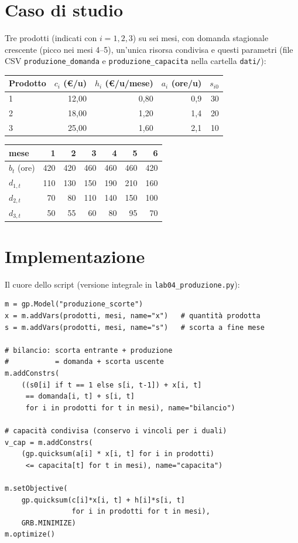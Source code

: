 \section{Caso di studio}

Tre prodotti (indicati con $i = 1, 2, 3$) su sei mesi, con domanda stagionale crescente (picco nei mesi
4--5), un'unica risorsa condivisa e questi parametri (file CSV
\texttt{produzione\_domanda} e \texttt{produzione\_capacita} nella cartella
\texttt{dati/}):

\begin{center}\small
\begin{tabular}{lrrrr}
\toprule
Prodotto & $c_i$ (\euro/u) & $h_i$ (\euro/u/mese) & $a_i$ (ore/u) & $s_{i0}$ \\
\midrule
1 & 12{,}00 & 0{,}80 & 0{,}9 & 30 \\
2 & 18{,}00 & 1{,}20 & 1{,}4 & 20 \\
3 & 25{,}00 & 1{,}60 & 2{,}1 & 10 \\
\bottomrule
\end{tabular}
\qquad
\begin{tabular}{lrrrrrr}
\toprule
mese & 1 & 2 & 3 & 4 & 5 & 6 \\
\midrule
$b_t$ (ore) & 420 & 420 & 460 & 460 & 460 & 420 \\
$d_{1,t}$ & 110 & 130 & 150 & 190 & 210 & 160 \\
$d_{2,t}$ & 70 & 80 & 110 & 140 & 150 & 100 \\
$d_{3,t}$ & 50 & 55 & 60 & 80 & 95 & 70 \\
\bottomrule
\end{tabular}
\end{center}

\section{Implementazione}

Il cuore dello script (versione integrale in \texttt{lab04\_produzione.py}):

\begin{lstlisting}[style=python]
m = gp.Model("produzione_scorte")
x = m.addVars(prodotti, mesi, name="x")   # quantità prodotta
s = m.addVars(prodotti, mesi, name="s")   # scorta a fine mese

# bilancio: scorta entrante + produzione
#           = domanda + scorta uscente
m.addConstrs(
    ((s0[i] if t == 1 else s[i, t-1]) + x[i, t]
     == domanda[i, t] + s[i, t]
     for i in prodotti for t in mesi), name="bilancio")

# capacità condivisa (conservo i vincoli per i duali)
v_cap = m.addConstrs(
    (gp.quicksum(a[i] * x[i, t] for i in prodotti)
     <= capacita[t] for t in mesi), name="capacita")

m.setObjective(
    gp.quicksum(c[i]*x[i, t] + h[i]*s[i, t]
                for i in prodotti for t in mesi),
    GRB.MINIMIZE)
m.optimize()
\end{lstlisting}

